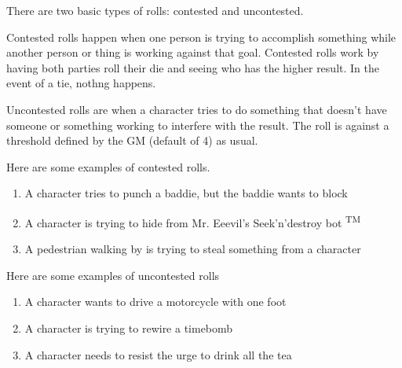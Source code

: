 \begin{flushleft}
There are two basic types of rolls: contested and uncontested.

Contested rolls happen when one person is trying to accomplish something while
another person or thing is working against that goal. Contested rolls work by
having both parties roll their die and seeing who has the higher result. In
the event of a tie, nothng happens.

Uncontested rolls are when a character tries to do something that doesn't have
someone or something working to interfere with the result. The roll is against
a threshold defined by the GM (default of 4) as usual.

Here are some examples of contested rolls.

\begin{enumerate}

    \item{A character tries to punch a baddie, but the baddie wants to block}
    \item{A character is trying to hide from Mr. Eeevil's Seek'n'destroy bot
          \textsuperscript{TM}}
    \item{A pedestrian walking by is trying to steal something from a
          character}

\end{enumerate}

Here are some examples of uncontested rolls

\begin{enumerate}

    \item{A character wants to drive a motorcycle with one foot}
    \item{A character is trying to rewire a timebomb}
    \item{A character needs to resist the urge to drink all the tea}

\end{enumerate}


\end{flushleft}
